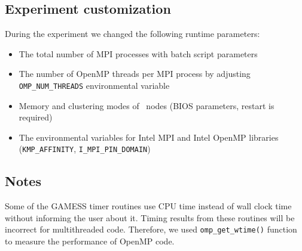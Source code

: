 \subsection{Experiment customization}
During the experiment we changed the following runtime parameters:
\begin{itemize}
	\item The total number of MPI processes with batch script parameters
    \item The number of OpenMP threads per MPI process by adjusting \verb|OMP_NUM_THREADS| environmental variable
    \item Memory and clustering modes of \intelphireg\ nodes (BIOS parameters, restart is required)
    \item The environmental variables for Intel MPI and Intel OpenMP libraries (\verb|KMP_AFFINITY|, \verb|I_MPI_PIN_DOMAIN|)
\end{itemize}
\subsection{Notes}
Some of the GAMESS timer routines use CPU time instead of wall clock time without informing the user about it. Timing results from these routines will be incorrect for multithreaded code. Therefore, we used  \verb|omp_get_wtime()| function to measure the performance of OpenMP code.

